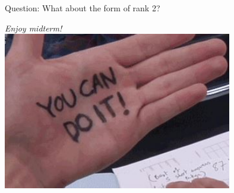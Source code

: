 Question: What about the form of rank 2?

\textit{Enjoy midterm!}\\
\includegraphics[width =10cm]{do_it}




















